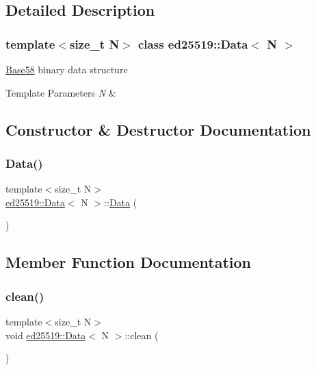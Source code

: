 \subsection{Detailed Description}
\subsubsection*{template$<$size\+\_\+t N$>$\newline
class ed25519\+::\+Data$<$ N $>$}

\mbox{\hyperlink{classed25519_1_1_base58}{Base58}} binary data structure 
\begin{DoxyTemplParams}{Template Parameters}
{\em N} & \\
\hline
\end{DoxyTemplParams}


\subsection{Constructor \& Destructor Documentation}
\mbox{\label{classed25519_1_1_data_a2c637587095d6527cd4136926fb8b452}} 
\subsubsection{\texorpdfstring{Data()}{Data()}}
{\footnotesize\ttfamily template$<$size\+\_\+t N$>$ \\
\mbox{\hyperlink{classed25519_1_1_data}{ed25519\+::\+Data}}$<$ N $>$\+::\mbox{\hyperlink{classed25519_1_1_data}{Data}} (\begin{DoxyParamCaption}{ }\end{DoxyParamCaption})\hspace{0.3cm}{\ttfamily [inline]}}



\subsection{Member Function Documentation}
\mbox{\label{classed25519_1_1_data_a65d5eba2b3c68f68001ef4d32645f9d9}} 
\subsubsection{\texorpdfstring{clean()}{clean()}}
{\footnotesize\ttfamily template$<$size\+\_\+t N$>$ \\
void \mbox{\hyperlink{classed25519_1_1_data}{ed25519\+::\+Data}}$<$ N $>$\+::clean (\begin{DoxyParamCaption}{ }\end{DoxyParamCaption})\hspace{0.3cm}{\ttfamily [inline]}}

